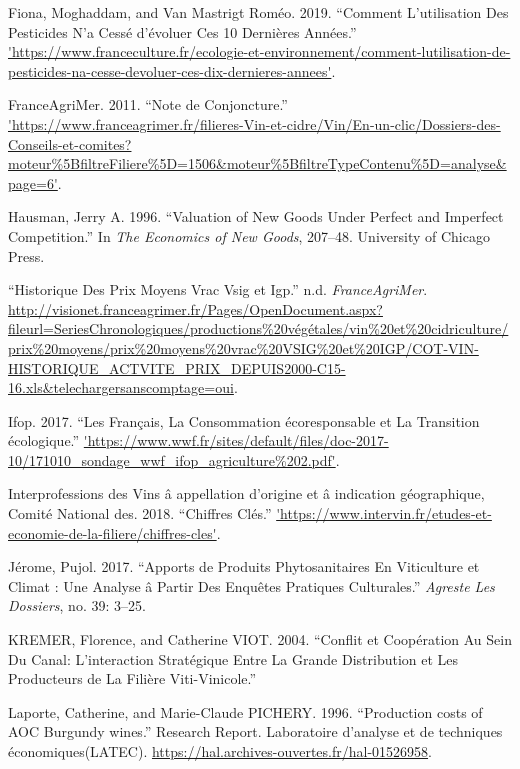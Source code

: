 \documentclass[11pt,]{article}
\begin{document}
\leavevmode\hypertarget{ref-Moghaddam2019}{}%
Fiona, Moghaddam, and Van Mastrigt Roméo. 2019. ``Comment L'utilisation
Des Pesticides N'a Cessé d'évoluer Ces 10 Dernières Années.''
\url{'https://www.franceculture.fr/ecologie-et-environnement/comment-lutilisation-de-pesticides-na-cesse-devoluer-ces-dix-dernieres-annees'}.

\leavevmode\hypertarget{ref-FranceAgriMer2011}{}%
FranceAgriMer. 2011. ``Note de Conjoncture.''
\url{'https://www.franceagrimer.fr/filieres-Vin-et-cidre/Vin/En-un-clic/Dossiers-des-Conseils-et-comites?moteur\%5BfiltreFiliere\%5D=1506\&moteur\%5BfiltreTypeContenu\%5D=analyse\&page=6'}.

\leavevmode\hypertarget{ref-hausman1996valuation}{}%
Hausman, Jerry A. 1996. ``Valuation of New Goods Under Perfect and
Imperfect Competition.'' In \emph{The Economics of New Goods}, 207--48.
University of Chicago Press.

\leavevmode\hypertarget{ref-franceagrimer}{}%
``Historique Des Prix Moyens Vrac Vsig et Igp.'' n.d.
\emph{FranceAgriMer}.
\url{http://visionet.franceagrimer.fr/Pages/OpenDocument.aspx?fileurl=SeriesChronologiques/productions\%20végétales/vin\%20et\%20cidriculture/prix\%20moyens/prix\%20moyens\%20vrac\%20VSIG\%20et\%20IGP/COT-VIN-HISTORIQUE_ACTVITE_PRIX_DEPUIS2000-C15-16.xls\&telechargersanscomptage=oui}.

\leavevmode\hypertarget{ref-Ifop2017}{}%
Ifop. 2017. ``Les Français, La Consommation écoresponsable et La
Transition écologique.''
\url{'https://www.wwf.fr/sites/default/files/doc-2017-10/171010_sondage_wwf_ifop_agriculture\%202.pdf'}.

\leavevmode\hypertarget{ref-CNIV2018}{}%
Interprofessions des Vins â appellation d'origine et â indication
géographique, Comité National des. 2018. ``Chiffres Clés.''
\url{'https://www.intervin.fr/etudes-et-economie-de-la-filiere/chiffres-cles'}.

\leavevmode\hypertarget{ref-Pujol2017}{}%
Jérome, Pujol. 2017. ``Apports de Produits Phytosanitaires En
Viticulture et Climat : Une Analyse â Partir Des Enquêtes Pratiques
Culturales.'' \emph{Agreste Les Dossiers}, no. 39: 3--25.

\leavevmode\hypertarget{ref-kremer2004}{}%
KREMER, Florence, and Catherine VIOT. 2004. ``Conflit et Coopération Au
Sein Du Canal: L'interaction Stratégique Entre La Grande Distribution et
Les Producteurs de La Filière Viti-Vinicole.''

\leavevmode\hypertarget{ref-laporte1996}{}%
Laporte, Catherine, and Marie-Claude PICHERY. 1996. ``Production costs
of AOC Burgundy wines.'' Research Report. Laboratoire d'analyse et de
techniques économiques(LATEC).
\url{https://hal.archives-ouvertes.fr/hal-01526958}.
\end{document}
